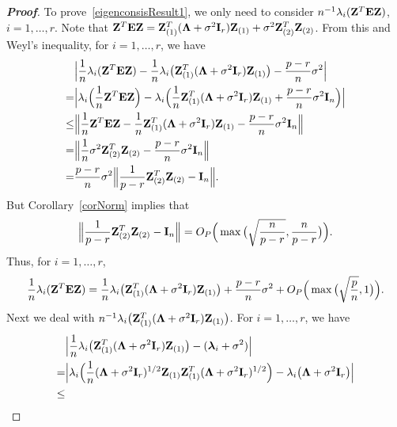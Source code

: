 \documentclass[3p]{elsarticle}
\newcommand{\bZ}{\mathbf{Z}}
\newcommand{\bfsym}[1]{\ensuremath{\boldsymbol{#1}}}
\def\blambda {\bfsym {\lambda}}        \def\bLambda {\bfsym {\Lambda}}
\theoremstyle{plain}
\theoremstyle{definition}
\theoremstyle{remark}
\begin{document}
\begin{appendices}
\begin{proof}[\textbf{Proof}]
    To prove~\eqref{eigenconsisResult1}, we only need to consider $n^{-1}\lambda_i(\bZ^T \BE \bZ)$, $i=1,\ldots, r$.
Note that
$
    \bZ^T \BE \bZ= \bZ_{(1)}^T (\bLambda +\sigma^2 \BI_r) \bZ_{(1)}+
\sigma^2 \bZ_{(2)}^T  \bZ_{(2)}
$.
From this and Weyl's inequality, 
for $i=1,\ldots, r$, we have 
$$
    \begin{aligned}
        &\Big|\frac{1}{n}\lambda_i(\BZ^T \BE \BZ)
    -\frac{1}{n}\lambda_i\big(\BZ_{(1)}^T (\bLambda+\sigma^2 \BI_r)\BZ_{(1)}\big)
    -\frac{p-r}{n}\sigma^2
    \Big|
        \\
        =&\Big|\lambda_i\Big(\frac{1}{n}\BZ^T \BE \BZ\Big)
        -\lambda_i\Big(\frac{1}{n}\BZ_{(1)}^T (\bLambda+\sigma^2 \BI_r)\BZ_{(1)}+\frac{p-r}{n}\sigma^2 \BI_{n}\Big)
    \Big|
        \\
        \leq &
        \Big\|\frac{1}{n}\BZ^T \BE \BZ
    -\frac{1}{n}\BZ_{(1)}^T (\bLambda+\sigma^2 \BI_r)\BZ_{(1)}
        -\frac{p-r}{n}\sigma^2\BI_{n}
        \Big\|
        \\
        = &
        \Big\|
        \frac{1}{n}\sigma^2 \bZ_{(2)}^T  \bZ_{(2)}
        -\frac{p-r}{n}\sigma^2\BI_{n}
        \Big\|
        \\
        = &
        \frac{p-r}{n}
\sigma^2
        \Big\|
        \frac{1}{p-r}
         \bZ_{(2)}^T  \bZ_{(2)}
        -\BI_{n}
        \Big\|.
    \end{aligned}
$$
    But Corollary~\ref{corNorm} implies that
    $$
        \Big\|
        \frac{1}{p-r}
         \bZ_{(2)}^T  \bZ_{(2)}
        -\BI_{n}
        \Big\|=O_P\Big(\max\big(\sqrt{\frac{n}{p-r}},\frac{n}{p-r}\big)\Big).
    $$
    Thus, for $i=1,\ldots,r$,
\begin{equation}\label{toutengjiayou1}
\frac{1}{n}\lambda_i(\BZ^T \BE \BZ)
=\frac{1}{n}\lambda_i\big(\BZ_{(1)}^T (\bLambda+\sigma^2 \BI_r)\BZ_{(1)}\big)
+\frac{p-r}{n}\sigma^2
+
O_P\Big(\max\big(\sqrt{\frac{p}{n}},1\big)\Big).
\end{equation}
    Next we deal with $n^{-1}\lambda_i\big(\BZ_{(1)}^T (\bLambda+\sigma^2 \BI_r)\BZ_{(1)}\big)$.
    For $i=1,\ldots, r$, we have
$$
    \begin{aligned}
        &\Big|\frac{1}{n}\lambda_i \big(\bZ_{(1)}^T(\bLambda+\sigma^2 \BI_r)\bZ_{(1)}\big)-(\blambda_i +\sigma^2)\Big|\\
        =&
        \Big|\lambda_i \Big(\frac{1}{n}(\bLambda+\sigma^2 \BI_r)^{1/2}\bZ_{(1)}\bZ_{(1)}^T(\bLambda+\sigma^2 \BI_r)^{1/2}\Big)
        -\lambda_i\big(\bLambda+\sigma^2 \BI_r\big)\Big|\\
        \leq &

\end{aligned}$$
\end{proof}
\end{appendices}
\end{document}
